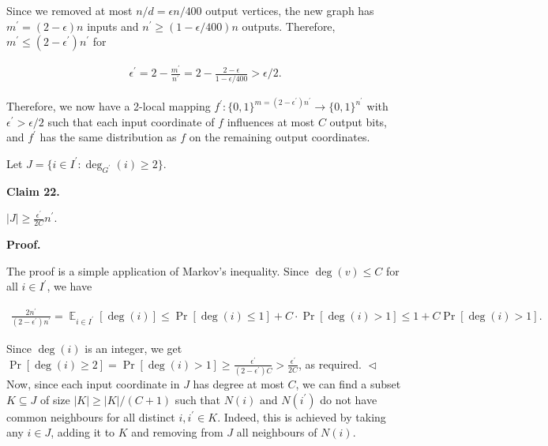 Since we removed at most $n/d=\epsilon n/400$ output vertices, the new graph has $m^{\prime}=(2-\epsilon)n$ inputs and $n^{\prime}\geq(1-\epsilon/400)n$ outputs. Therefore,
$m^{\prime}\leq(2-\epsilon^{\prime})n^{\prime}$ for\par


\[\begin{gathered}
\epsilon^{\prime}=2-\frac{m^{\prime}}{n^{\prime}}=2-\frac{2-\epsilon}{1-\epsilon/400}>\epsilon/2.
\end{gathered}\]




Therefore, we now have a 2-local mapping $f^{\prime}\colon\{0,1\}^{m=(2-\epsilon^{\prime})n^{\prime}}\to\{0,1\}^{n^{\prime}}$ with $\epsilon^{\prime}>\epsilon/2$ such that each input coordinate of $f$ influences at most $C$ output bits, and $f^{\prime}$ has the same distribution as $f$ on the remaining output coordinates.\par




Let $J=\{i\in I^{\prime}:\deg_{G^{\prime}}(i)\geq 2\}$.\par





\par\medskip\noindent\textbf{
Claim 22. 
}\par



$\lvert J\rvert\geq\frac{\epsilon^{\prime}}{2C}n^{\prime}$.\par







\par\medskip\noindent\textbf{
\textbf{Proof}.}\par




The proof is a simple application of Markov’s inequality.
Since $\deg(v)\leq C$ for all $i\in I^{\prime}$, we have\par


\[\begin{gathered}
\frac{2n^{\prime}}{(2-\epsilon^{\prime})n^{\prime}}=\operatorname{\mathbb{E}}_{i\in I^{\prime}}[\deg(i)]\leq\Pr[\deg(i)\leq 1]+C\cdot\Pr[\deg(i)>1]\leq 1+C\Pr[\deg(i)>1].
\end{gathered}\]


Since $\deg(i)$ is an integer, we get
$\Pr[\deg(i)\geq 2]=\Pr[\deg(i)>1]\geq\frac{\epsilon^{\prime}}{(2-\epsilon^{\prime})C}>\frac{\epsilon^{\prime}}{2C}$,
as required.
$\vartriangleleft$
Now, since each input coordinate in $J$ has degree at most $C$, we can find a subset $K\subseteq J$ of size $\lvert K\rvert\geq\lvert K\rvert/(C+1)$ such that $N(i)$ and $N(i^{\prime})$ do not have common neighbours for all distinct $i,i^{\prime}\in K$. Indeed, this is achieved by taking any $i\in J$, adding it to $K$ and removing from $J$ all neighbours of $N(i)$.\par




